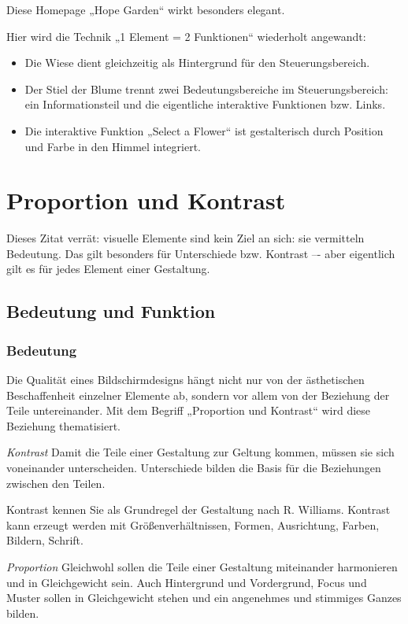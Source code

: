Diese Homepage „Hope Garden“ wirkt besonders elegant.

Hier wird die Technik „1 Element = 2 Funktionen“ wiederholt angewandt:
\begin{itemize}
\item Die Wiese dient gleichzeitig als Hintergrund für den Steuerungsbereich.
\item Der Stiel der Blume trennt zwei Bedeutungsbereiche im Steuerungsbereich: ein Informationsteil und die eigentliche interaktive Funktionen bzw. Links.
\item Die interaktive Funktion „Select a Flower“ ist gestalterisch durch Position und Farbe in den Himmel integriert.
\end{itemize}


\section{Proportion und Kontrast}
Dieses Zitat verrät: visuelle Elemente sind  kein Ziel an sich: sie vermitteln Bedeutung. Das gilt besonders für Unterschiede bzw. Kontrast –- aber eigentlich gilt es für jedes Element einer Gestaltung.

\subsection{Bedeutung und Funktion}
\subsubsection*{Bedeutung}
Die Qualität eines Bildschirmdesigns hängt nicht nur von der ästhetischen Beschaffenheit einzelner Elemente ab, sondern vor allem von der Beziehung der Teile untereinander. Mit dem Begriff „Proportion und Kontrast“ wird diese Beziehung thematisiert.\bigskip

\emph{Kontrast}
Damit die Teile einer Gestaltung zur Geltung kommen, müssen sie sich voneinander unterscheiden. Unterschiede bilden die Basis für die Beziehungen zwischen den Teilen.

Kontrast kennen Sie als Grundregel der Gestaltung nach R. Williams. Kontrast kann erzeugt werden mit Größenverhältnissen, Formen, Ausrichtung, Farben, Bildern, Schrift.\bigskip

\emph{Proportion}
Gleichwohl sollen die Teile einer Gestaltung miteinander harmonieren und in Gleichgewicht sein. Auch Hintergrund und Vordergrund, Focus und Muster sollen in Gleichgewicht stehen und ein angenehmes und stimmiges Ganzes bilden.

